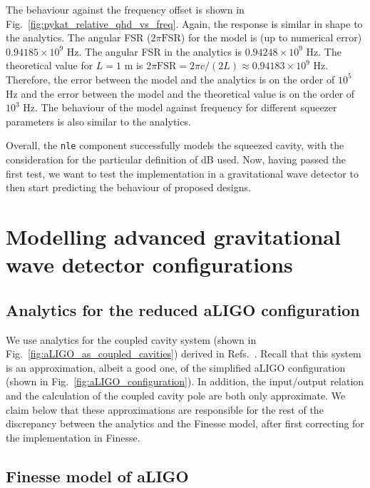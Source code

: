 \documentclass[aps,pra,superscriptaddress,reprint,nofootinbib]{revtex4-1}
\newcommand{\code}[1]{\texttt{#1}}
\begin{document}
The behaviour against the frequency offset is shown in Fig.~\ref{fig:pykat_relative_qhd_vs_freq}. Again, the response is similar in shape to the analytics.
The angular FSR ($2 \pi \mathrm{FSR}$) for the model is (up to numerical error) $0.94185 \times 10^9$ Hz.
The angular FSR in the analytics is $0.94248 \times 10^9$ Hz.
The theoretical value for $L = 1$ m is $2 \pi \mathrm{FSR} = 2 \pi c/(2 L) \approx 0.94183 \times 10^9$ Hz.
Therefore, the error between the model and the analytics is on the order of $10^5$ Hz and the error between the model and the theoretical value is on the order of $10^3$ Hz.
The behaviour of the model against frequency for different squeezer parameters is also similar to the analytics.


Overall, the \code{nle} component successfully models the squeezed cavity, with the consideration for the particular definition of dB used. Now, having passed the first test, we want to test the implementation in a gravitational wave detector to then start predicting the behaviour of proposed designs.


\section{Modelling advanced gravitational wave detector configurations}
\label{sec:aLIGOcomparison}

\subsection{Analytics for the reduced aLIGO configuration}

We use analytics for the coupled cavity system (shown in Fig.~\ref{fig:aLIGO_as_coupled_cavities}) derived in Refs.~\cite{Korobko_2019,SOMIYA2016521}. Recall that this system is an approximation, albeit a good one, of the simplified aLIGO configuration (shown in Fig.~\ref{fig:aLIGO_configuration}). In addition, the input/output relation and the calculation of the coupled cavity pole are both only approximate. We claim below that these approximations are responsible for the rest of the discrepancy between the analytics and the Finesse model, after first correcting for the implementation in Finesse.


\subsection{Finesse model of aLIGO}
\end{document}
